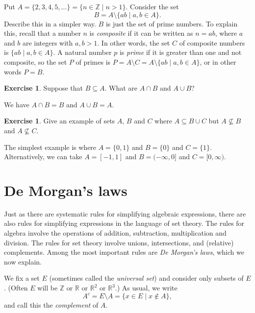\documentclass[a4paper]{book}
\newcommand{\PURPLE}[1]{{\color{purple}#1}}
\newcommand{\Z}         {{\mathbb{Z}}}
\newcommand{\R}         {{\mathbb{R}}}
\newcommand{\sm}        {\setminus}
\newcommand{\sse}       {\subseteq}
\newcommand{\st}        {\;|\;}
\renewcommand{\:}{\colon}
\newcommand{\DEFN}[1]{\PURPLE{\emph{#1}}}
\theoremstyle{definition}
\newtheorem{exercise}[theorem]{Exercise}
\newenvironment{starex}{
 \renewcommand{\thetheorem}{\arabic{chapter}.\arabic{section}.\arabic{theorem}${}^*$}
 \exercise
}{\endexercise}
\renewenvironment{solution}{\SolutionInline}{\endSolutionInline}
\begin{document}
\begin{starex}
 Put $A=\{2,3,4,5,\dotsc\}=\{n\in\Z\st n>1\}$.  Consider the set
 \[ B = A\sm \{ab\st a,b\in A\}. \]
 Describe this in a simpler way.
\end{starex}
\begin{solution}
 $B$ is just the set of prime numbers.  To explain this, recall that a
 number $n$ is \DEFN{composite} if it can be written as $n=ab$, where
 $a$ and $b$ are integers with $a,b>1$.  In other words, the set $C$
 of composite numbers is $\{ab\st a,b\in A\}$.  A natural number $p$
 is \DEFN{prime} if it is greater than one and not composite, so the
 set $P$ of primes is $P=A\sm C=A\sm\{ab\st a,b\in A\}$, or in other
 words $P=B$.
\end{solution}
\begin{exercise}
 Suppose that $B\sse A$.  What are $A\cap B$ and $A\cup B$?
\end{exercise}
\begin{solution}
 We have $A\cap B=B$ and $A\cup B=A$.  
\end{solution}
\begin{exercise}
 Give an example of sets $A$, $B$ and $C$ where $A\sse B\cup C$ but
 $A\not\sse B$ and $A\not\sse C$.
\end{exercise}
\begin{solution}
 The simplest example is where $A=\{0,1\}$ and $B=\{0\}$ and
 $C=\{1\}$.  Alternatively, we can take $A=[-1,1]$ and $B=(-\infty,0]$
 and $C=[0,\infty)$.
\end{solution}

\section{De Morgan's laws}
\label{sec-de-morgan}

Just as there are systematic rules for simplifying algebraic
expressions, there are also rules for simplifying expressions in the
language of set theory.  The rules for algebra involve the operations
of addition, subtraction, multiplication and division.  The rules for
set theory involve unions, intersections, and (relative) complements.
Among the most important rules are \DEFN{De Morgan's laws}, which we
now explain.

We fix a set $E$ (sometimes called the \DEFN{universal set}) and
consider only subsets of $E$.  (Often $E$ will be $\Z$ or $\R$ or
$\R^2$ or $\R^3$.)  As usual, we write 
\[ A^c = E\sm A = \{x\in E\st x\not\in A\}, \]
and call this the \DEFN{complement} of $A$.
\end{document}
